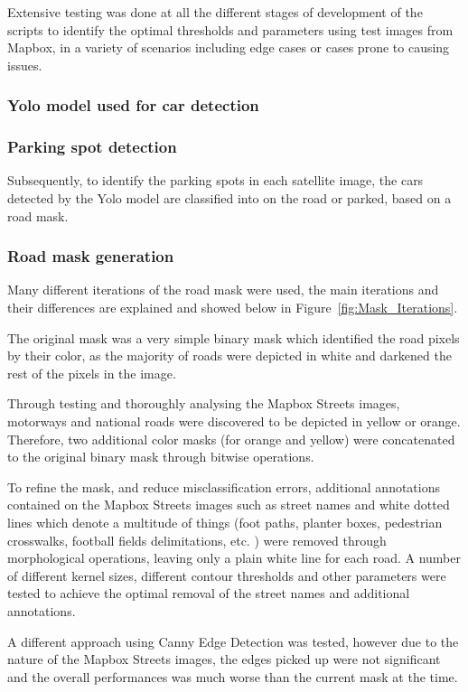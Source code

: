 Extensive testing was done at all the different stages of development of the scripts to identify the optimal thresholds and parameters using test images from Mapbox, in a variety of scenarios including edge cases or cases prone to causing issues.

\subsubsection{Yolo model used for car detection}


\subsubsection{Parking spot detection}
Subsequently, to identify the parking spots in each satellite image, the cars detected by the Yolo model are classified into on the road or parked, based on a road mask.

\subsubsection{Road mask generation}
Many different iterations of the road mask were used, the main iterations and their differences are explained and showed below in Figure~\ref{fig:Mask_Iterations}.

The original mask was a very simple binary mask which identified the road pixels by their color, as the majority of roads were depicted in white and darkened the rest of the pixels in the image.

Through testing and thoroughly analysing the Mapbox Streets images, motorways and national roads were discovered to be depicted in yellow or orange. Therefore, two additional color masks (for orange and yellow) were concatenated to the original binary mask through bitwise operations.

To refine the mask, and reduce misclassification errors, additional annotations contained on the Mapbox Streets images such as street names and white dotted lines which denote a multitude of things (foot paths, planter boxes, pedestrian crosswalks, football fields delimitations, etc. ) were removed through morphological operations, leaving only a plain white line for each road.
A number of different kernel sizes, different contour thresholds and other parameters were tested to achieve the optimal removal of the street names and additional annotations.

A different approach using Canny Edge Detection was tested, however due to the nature of the Mapbox Streets images, the edges picked up were not significant and the overall performances was much worse than the current mask at the time.

